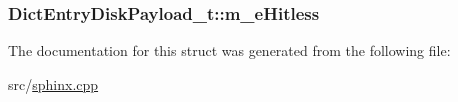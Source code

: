 \hypertarget{structDictEntryDiskPayload__t_a74d2896c583371a8f42e5cb21aa174d9}{
\subsubsection[{m\-\_\-e\-Hitless}]{ Dict\-Entry\-Disk\-Payload\-\_\-t\-::m\-\_\-e\-Hitless}}\label{structDictEntryDiskPayload__t_a74d2896c583371a8f42e5cb21aa174d9}


The documentation for this struct was generated from the following file\-:\begin{DoxyCompactItemize}
\item 
src/\hyperlink{sphinx_8cpp}{sphinx.\-cpp}\end{DoxyCompactItemize}
